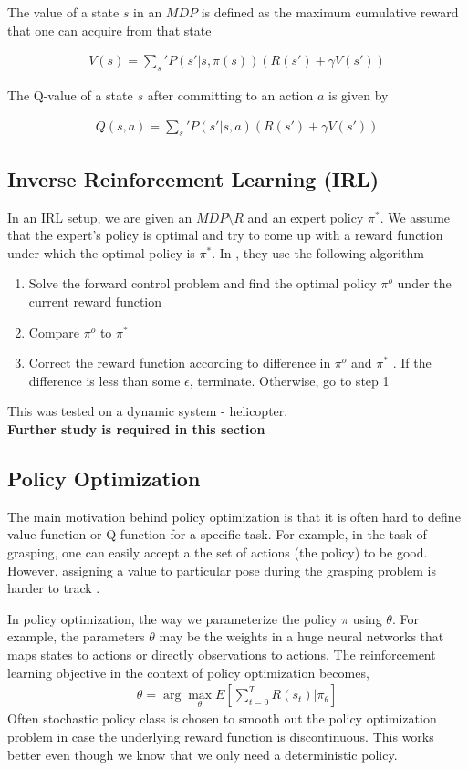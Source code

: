 \documentclass[11pt]{article}
\begin{document}
The value of a state $s$ in an $MDP$ is defined as the maximum cumulative reward that one can acquire from that state

\begin{align}
  V(s) = \sum_s' P(s'|s,\pi(s)) (R(s') + \gamma V(s')) 
\end{align}

The Q-value of a state $s$ after committing to an action $a$ is given by

\begin{align}
  Q(s,a) = \sum_s' P(s'|s,a) (R(s') + \gamma V(s')) 
\end{align}

\subsection{Inverse Reinforcement Learning (IRL)}
In an IRL setup, we are given an $MDP \setminus R$ and an expert policy $\pi^*$. We assume that the expert's policy is optimal and try to come up with a reward function under which the optimal policy is $\pi^*$. In \cite{irl}, they use the following algorithm
\begin{enumerate}
\item Solve the forward control problem and find the optimal policy $\pi^o$ under the current reward function
\item Compare $\pi^o$ to $\pi^*$ 
\item Correct the reward function according to difference in $\pi^o$ and $\pi^*$ . If the difference is less than some $\epsilon$, terminate. Otherwise, go to step 1
\end{enumerate}

This was tested on a dynamic system - helicopter.\\ \textbf{Further study is required in this section}

\subsection{Policy Optimization}
The main motivation behind policy optimization is that it is often hard to define value function or Q function for a specific task. For example, in the task of grasping, one can easily accept a the set of actions (the policy) to be good. However, assigning a value to particular pose during the grasping problem is harder to track \cite{drlnips}. 


 In policy optimization, the way we parameterize the policy $\pi$ using $\theta$. For example, the parameters $\theta$ may be the weights in a huge neural networks that maps states to actions or directly observations to actions. The reinforcement learning objective in the context of policy optimization becomes, 
\begin{align}
  \theta = \arg \max_\theta E[\sum_{t=0}^TR(s_t)|\pi_\theta]
\end{align}
Often stochastic policy class is chosen to smooth out the policy optimization problem in case the underlying reward function is discontinuous. This works better even though we know that we only need a deterministic policy. 
\end{document}
